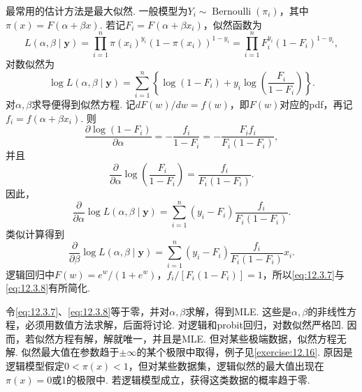 最常用的估计方法是最大似然. 一般模型为$Y_i\sim\operatorname{Bernoulli}(\pi_i)$，其中$\pi(x)=F(\alpha+\beta x)$. 若记$F_i=F(\alpha+\beta x_i)$，似然函数为
$$L(\alpha,\beta\mid\boldsymbol y)=\prod_{i=1}^n\pi(x_i)^{y_i}(1-\pi(x_i))^{1-y_i}
=\prod_{i=1}^nF_i^{y_i}(1-F_i)^{1-y_i},$$
对数似然为
$$\log L(\alpha,\beta\mid\boldsymbol y)=\sum_{i=1}^n\left\{\log(1-F_i)+y_i\log\left(\frac{F_i}{1-F_i}\right)\right\}.$$
对$\alpha,\beta$求导便得到似然方程. 记$dF(w)/dw=f(w)$，即$F(w)$对应的pdf，再记$f_i=f(\alpha+\beta x_i)$. 则
$$\frac{\partial\log(1-F_i)}{\partial\alpha}=-\frac{f_i}{1-F_i}=-\frac{F_if_i}{F_i(1-F_i)},$$
并且
\begin{equation}\label{eq:12.3.6}
\frac\partial{\partial\alpha}\log\left(\frac{F_i}{1-F_i}\right)=\frac{f_i}{F_i(1-F_i)}.
\end{equation}
因此，
\begin{equation}\label{eq:12.3.7}
\frac\partial{\partial\alpha}\log L(\alpha,\beta\mid\boldsymbol y)
=\sum_{i=1}^n(y_i-F_i)\frac{f_i}{F_i(1-F_i)}.
\end{equation}
类似计算得到
\begin{equation}\label{eq:12.3.8}
\frac\partial{\partial\beta}\log L(\alpha,\beta\mid\boldsymbol y)
=\sum_{i=1}^n(y_i-F_i)\frac{f_i}{F_i(1-F_i)}x_i.
\end{equation}
逻辑回归中$F(w)=e^w/(1+e^w)$，$f_i/[F_i(1-F_i)]=1$，所以\eqref{eq:12.3.7}与\eqref{eq:12.3.8}有所简化.

令\eqref{eq:12.3.7}、\eqref{eq:12.3.8}等于零，并对$\alpha,\beta$求解，得到MLE. 这些是$\alpha,\beta$的非线性方程，必须用数值方法求解，后面将讨论. 对逻辑和probit回归，对数似然严格凹. 因而，若似然方程有解，解就唯一，并且是MLE. 但对某些极端数据，似然方程无解. 似然最大值在参数趋于$\pm\infty$的某个极限中取得，例子见\autoref{exercise:12.16}. 原因是逻辑模型假定$0<\pi(x)<1$，但对某些数据集，逻辑似然的最大值出现在$\pi(x)=0$或1的极限中. 若逻辑模型成立，获得这类数据的概率趋于零.

